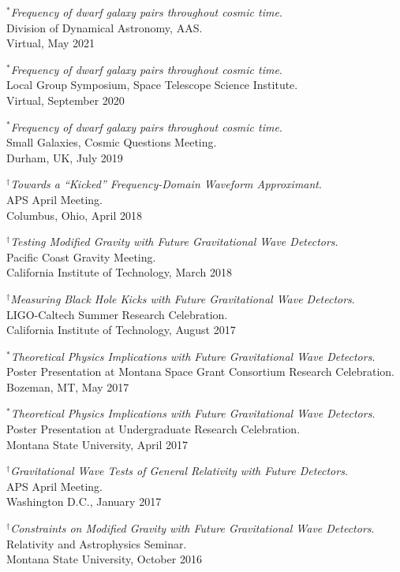 \documentclass[margin]{res}
\begin{document}
\begin{resume}
\emph{${}^{*}$Frequency of dwarf galaxy pairs throughout cosmic time}. \\
Division of Dynamical Astronomy, AAS.\\  
Virtual, May 2021

\emph{${}^{*}$Frequency of dwarf galaxy pairs throughout cosmic time}. \\
Local Group Symposium, Space Telescope Science Institute.\\  
Virtual, September 2020

\emph{${}^{*}$Frequency of dwarf galaxy pairs throughout cosmic time}. \\
Small Galaxies, Cosmic Questions Meeting.\\  
Durham, UK, July 2019

\emph{${}^{\dagger}$Towards a ``Kicked'' Frequency-Domain Waveform Approximant}. \\
APS April Meeting.\\  
Columbus, Ohio, April 2018

\emph{${}^{\dagger}$Testing Modified Gravity with Future Gravitational Wave Detectors}. \\
Pacific Coast Gravity Meeting.\\  
California Institute of Technology, March 2018

\emph{${}^{\dagger}$Measuring Black Hole Kicks with Future Gravitational Wave Detectors}. \\
LIGO-Caltech Summer Research Celebration.\\  
California Institute of Technology, August 2017

\emph{$^{*}$Theoretical Physics Implications with Future Gravitational Wave Detectors}.\\
Poster Presentation at Montana Space Grant Consortium Research Celebration. \\
Bozeman, MT, May 2017

\emph{$^{*}$Theoretical Physics Implications with Future Gravitational Wave Detectors}. \\
Poster Presentation at Undergraduate Research Celebration.\\
Montana State University, April 2017

\emph{${}^{\dagger}$Gravitational Wave Tests of General Relativity with Future Detectors}.\\
APS April Meeting. \\
Washington D.C., January 2017

\emph{${}^{\dagger}$Constraints on Modified Gravity with Future Gravitational Wave Detectors}. \\
Relativity and Astrophysics Seminar. \\
Montana State University, October 2016


\end{resume}
\end{document}
